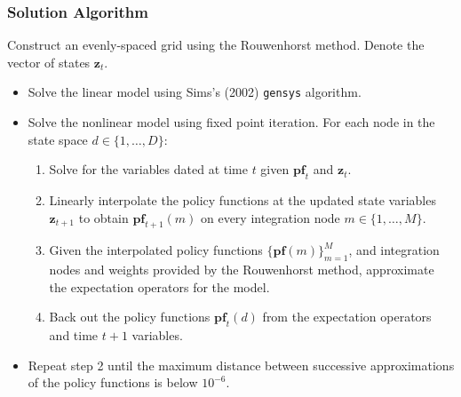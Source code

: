\documentclass[11pt]{beamer}
\begin{document}
\begin{frame}\frametitle{Solution Algorithm} %
 Construct an evenly-spaced grid using the Rouwenhorst method. Denote the vector of states $\textbf{z}_t$. %
\begin{itemize}\setlength{\itemsep}{8pt}

\item Solve the linear model using Sims's (2002) \texttt{gensys} algorithm. 
\item Solve the nonlinear model using fixed point iteration. For each node in the state space $d \in \{1,\dots,D\}:$
\begin{enumerate}\setlength{\itemsep}{2pt}
\item Solve for the variables dated at time $t$ given $\textbf{pf}_t$ and $\textbf{z}_t$. %
\item  Linearly interpolate the policy functions at the updated state variables $\textbf{z}_{t+1}$ to obtain $\textbf{pf}_{t+1}(m)$ on every integration node $m \in \{1,\dots,M\}$.%
\item Given the interpolated policy functions $\{\textbf{pf}(m)\}_{m=1}^M$, and integration nodes and weights provided by the Rouwenhorst method, approximate the expectation operators for the model. %
\item Back out the policy functions $\textbf{pf}_t(d)$ from the expectation operators and time $t+1$ variables. %
\end{enumerate}
\item Repeat step 2 until the maximum distance between successive approximations of the policy functions is below $10^{-6}$. 
\end{itemize}
\end{frame}
\end{document}
